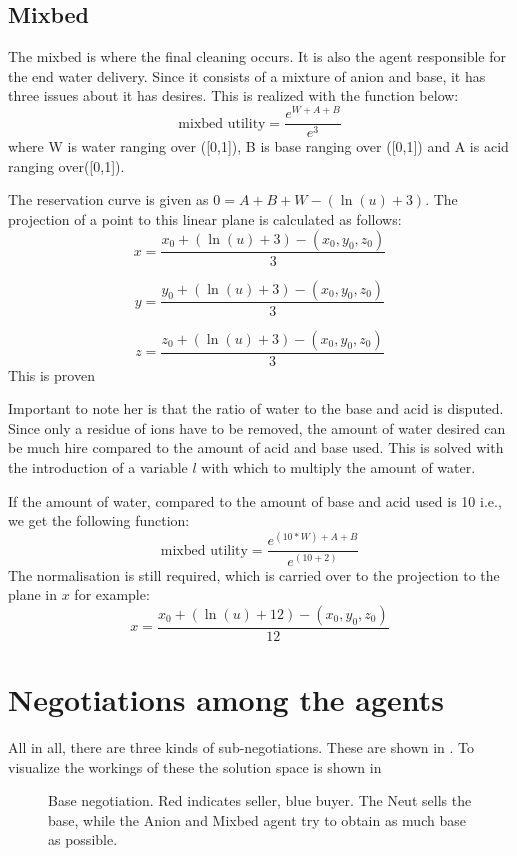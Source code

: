 \subsection{Mixbed}

The mixbed is where the final cleaning occurs. It is also the agent responsible for the end water delivery. Since it consists of a mixture of anion and base, it has three issues about it has desires. This is realized with the function below:
\[
\text{mixbed utility} = \frac{e^{W+A+B}}{e^3}
\] 
where W is water ranging over ([0,1]), B is base ranging over ([0,1]) and A is acid ranging over([0,1]).

The reservation curve is given as $0 = A+B+W - (\ln(u)+3)  $. The projection of a point to this linear plane is calculated as follows:
\[
x = \frac{x_0 + (\ln(u)+3) - (x_0, y_0, z_0)}{3}
\]

\[
y = \frac{y_0 + (\ln(u)+3) - (x_0, y_0, z_0)}{3} 
\]

\[
z = \frac{z_0 + (\ln(u)+3) - (x_0, y_0, z_0)}{3}
\]
This is proven 

Important to note her is that the ratio of water to the base and acid is disputed. Since only a residue of ions have to be removed, the amount of water desired can be much hire compared to the amount of acid and base used. This is solved with the introduction of a variable $l$ with which to multiply the amount of water. 

If the amount of water, compared to the amount of base and acid used is 10 i.e., we get the following function:
 \[
 \text{mixbed utility} = \frac{e^{(10*W)+A+B}}{e^(10+2)}
 \] 
The normalisation is still required, which is carried over to the projection to the plane in $x$ for example:
\[
x = \frac{x_0 + (\ln(u)+12) - (x_0, y_0, z_0)}{12}
\]
\section{Negotiations among the agents}
All in all, there are three kinds of sub-negotiations. These are shown in . To visualize the workings of these the solution space is shown in \

\begin{figure}[h]
	\centering
	\caption{Base negotiation. Red indicates seller, blue buyer. The Neut sells the base, while the Anion and Mixbed agent try to obtain as much base as possible.}
	\label{fig:agent-plant-base}
\end{figure}



